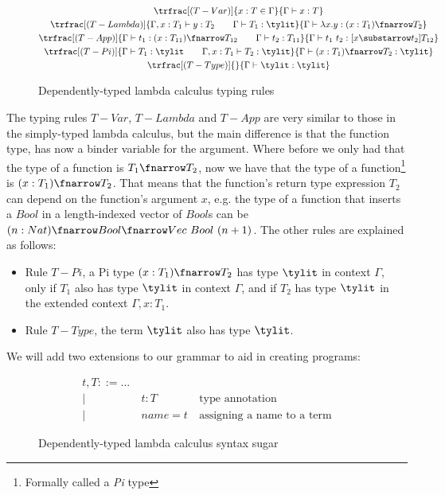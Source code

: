 \begin{figure}[H]
       \[
              \begin{gathered}
                     \trfrac[(T-Var)]{x:T \in \Gamma}{\Gamma \vdash x : T} \\
                     \trfrac[(T-Lambda)]{\Gamma, x:T_1 \vdash y: T_2 \qquad \Gamma \vdash T_1 : \tylit}{\Gamma \vdash \lambda x.y : (x:T_1) \fnarrow T_2} \\
                     \trfrac[(T-App)]{\Gamma \vdash t_1 : (x:T_{11}) \fnarrow T_{12} \qquad \Gamma \vdash t_2 : T_{11}}{\Gamma \vdash t_1\ t_2 : [x \substarrow t_2]T_{12}} \\
                     \trfrac[(T-Pi)]{\Gamma \vdash T_1 : \tylit \qquad \Gamma, x: T_1 \vdash T_2 : \tylit}{\Gamma \vdash (x:T_1) \fnarrow T_2 : \tylit} \\
                     \trfrac[(T-Type)]{}{\Gamma \vdash \tylit : \tylit}
              \end{gathered}
       \]
       \caption{Dependently-typed lambda calculus typing rules}
       \label{fig:dep-lambda-calc-typing-rules}
\end{figure}

The typing rules $T-Var$, $T-Lambda$ and $T-App$ are very similar to those in the simply-typed lambda calculus, but the main difference is that the function type, has now a binder variable for the argument.
Where before we only had that the type of a function is $T_1 \fnarrow T_2$, now we have that the type of a function\footnote{Formally called a \emph{Pi} type} is $(x:T_1) \fnarrow T_2$. That means that the function's return type expression $T_2$ can depend on the function's argument $x$, e.g. the type of a function that inserts a $Bool$ in a length-indexed vector of $Bool$s can be $(n:Nat) \fnarrow Bool \fnarrow Vec\ Bool\ (n+1)$.
The other rules are explained as follows:
\begin{itemize}
       \item Rule $T-Pi$, a Pi type $(x:T_1)\fnarrow T_2$ has type $\tylit$ in context $\Gamma$, only if $T_1$ also has type $\tylit$ in context $\Gamma$, and if $T_2$ has type $\tylit$ in the extended context $\Gamma, x:T_1$.
       \item Rule $T-Type$, the term $\tylit$ also has type $\tylit$.
\end{itemize}

We will add two extensions to our grammar to aid in creating programs:

\begin{figure}[H]
       \[
              \begin{aligned}
                     t, T ::= ...                                         \\
                     | & \ t : T    & \ \text{type annotation}            \\
                     | & \ name = t & \ \text{assigning a name to a term}
              \end{aligned}
       \]
       \caption{Dependently-typed lambda calculus syntax sugar}
\end{figure}

